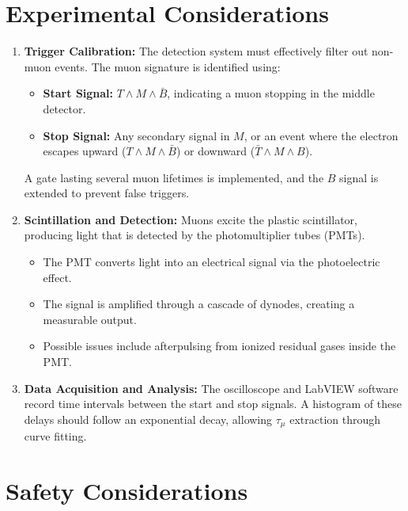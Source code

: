 \documentclass[aps,prb,onecolumn,11pt,superscriptaddress,floatfix,longbibliography]{revtex4-2}
\begin{document}
\section{\label{sec:experiment}Experimental Considerations}

\begin{enumerate}
    \item \textbf{Trigger Calibration:}  
    The detection system must effectively filter out non-muon events. The muon signature is identified using:  
    \begin{itemize}
        \item \textbf{Start Signal:} \(T \wedge M \wedge \bar{B}\), indicating a muon stopping in the middle detector.
        \item \textbf{Stop Signal:} Any secondary signal in \(M\), or an event where the electron escapes upward (\(T \wedge M \wedge \bar{B}\)) or downward (\(\bar{T} \wedge M \wedge B\)).
    \end{itemize}
    A gate lasting several muon lifetimes is implemented, and the \(B\) signal is extended to prevent false triggers.

    \item \textbf{Scintillation and Detection:}  
    Muons excite the plastic scintillator, producing light that is detected by the photomultiplier tubes (PMTs).  
    \begin{itemize}
        \item The PMT converts light into an electrical signal via the photoelectric effect.
        \item The signal is amplified through a cascade of dynodes, creating a measurable output.
        \item Possible issues include afterpulsing from ionized residual gases inside the PMT.
    \end{itemize}

    \item \textbf{Data Acquisition and Analysis:}  
    The oscilloscope and LabVIEW software record time intervals between the start and stop signals. A histogram of these delays should follow an exponential decay, allowing \(\tau_\mu\) extraction through curve fitting.
\end{enumerate}

\section{\label{sec:safety}Safety Considerations}
\end{document}
